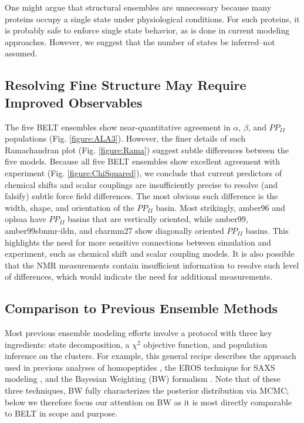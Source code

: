 \documentclass[11pt,titlepage]{article}
\begin{document}
One might argue that structural ensembles are unnecessary because many proteins occupy a single state under physiological conditions.  For such proteins, it is probably safe to enforce single state behavior, as is done in current modeling approaches. However, we suggest that the number of states be inferred--not assumed.  


\subsection*{Resolving Fine Structure May Require Improved Observables}

The five BELT ensembles show near-quantitative agreement in $\alpha$, $\beta$, and $PP_{II}$ populations (Fig. \ref{figure:ALA3}).  However, the finer details of each Ramachandran plot (Fig. \ref{figure:Rama}) suggest subtle differences between the 
five models.  Because all five BELT ensembles show excellent agreement with experiment (Fig. \ref{figure:ChiSquared}), we conclude that current predictors of chemical shifts and scalar couplings are insufficiently precise to resolve (and falsify) subtle force field differences.  The most obvious such difference is the width, shape, and orientation of the $PP_{II}$ basin.  Most strikingly, amber96 and oplsaa have $PP_{II}$ basins that are vertically oriented, while amber99, amber99sbnmr-ildn, and charmm27 show diagonally oriented $PP_{II}$ basins.  This highlights the need for more sensitive connections between simulation and experiment, such as chemical shift and scalar coupling models.  It is also possible that the NMR measurements contain insufficient information to resolve such level of differences, which would indicate the need for additional measurements.  


\subsection*{Comparison to Previous Ensemble Methods}

Most previous ensemble modeling efforts involve a protocol with three key ingredients: state decomposition, a $\chi^2$ objective function, and population inference on the clusters.  For example, this general recipe describes the approach used in previous analyses of homopeptides  \citep{Graf2007}, the EROS technique for SAXS modeling  \citep{rozycki2011saxs}, and the Bayesian Weighting (BW) formalism  \citep{fisher2010}.  Note that of these three techniques, BW fully characterizes the posterior distribution via MCMC; below we therefore focus our attention on BW as it is most directly comparable to BELT in scope and purpose.
\end{document}
